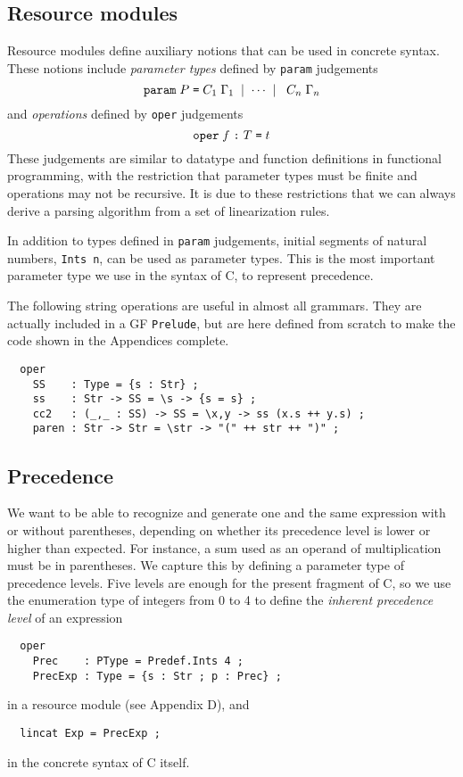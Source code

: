 \documentclass[12pt]{article}
\newcommand{\empha}[1]{{\em #1}}
\begin{document}
\subsection{Resource modules}

Resource modules define auxiliary notions that can be
used in concrete syntax. These notions include
\empha{parameter types} defined by \texttt{param}
judgements
\[
\mbox{\texttt{param}} \; P \; \mbox{\texttt{=}} 
  \; C_{1} \; \Gamma_{1} \; \mid \; \cdots \; \mid \; 
  \; C_{n} \; \Gamma_{n}
\]
and \empha{operations} defined by
\texttt{oper} judgements
\[
\mbox{\texttt{oper}} \; f \; \mbox{\texttt{:}} \; T \; \mbox{\texttt{=}} \; t
\]
These judgements are
similar to datatype and function definitions
in functional programming, with the restriction
that parameter types must be finite and operations
may not be recursive. It is due to these restrictions that
we can always derive a parsing algorithm from a set of
linearization rules.

In addition to types defined in \texttt{param} judgements,
initial segments of natural numbers, \texttt{Ints n},
can be used as parameter types. This is the most important parameter
type we use in the syntax of C, to represent precedence.

The following string operations are useful in almost
all grammars. They are actually included in a GF \texttt{Prelude},
but are here defined from scratch to make the code shown in
the Appendices complete.
\begin{verbatim}
  oper
    SS    : Type = {s : Str} ;
    ss    : Str -> SS = \s -> {s = s} ;
    cc2   : (_,_ : SS) -> SS = \x,y -> ss (x.s ++ y.s) ;
    paren : Str -> Str = \str -> "(" ++ str ++ ")" ;
\end{verbatim}



\subsection{Precedence}

We want to be able to recognize and generate one and the same expression with
or without parentheses, depending on whether its precedence level
is lower or higher than expected. For instance, a sum used as
an operand of multiplication must be in parentheses. We
capture this by defining a parameter type of
precedence levels. Five levels are enough for the present
fragment of C, so we use the enumeration type of 
integers from 0 to 4 to define the \empha{inherent precedence level}
of an expression
\begin{verbatim} 
  oper 
    Prec    : PType = Predef.Ints 4 ;
    PrecExp : Type = {s : Str ; p : Prec} ;
\end{verbatim}
in a resource module (see Appendix D), and
\begin{verbatim}
  lincat Exp = PrecExp ;
\end{verbatim}
in the concrete syntax of C itself. 
\end{document}
